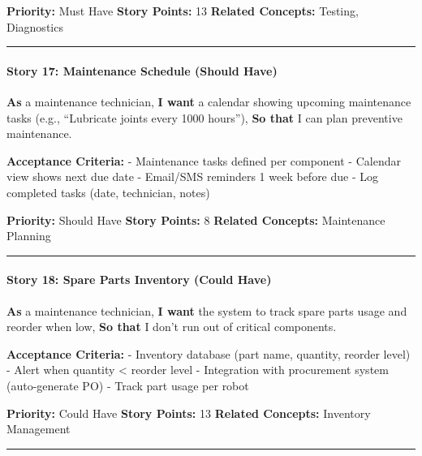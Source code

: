\documentclass[
]{article}
\begin{document}
\textbf{Priority:} Must Have \textbf{Story Points:} 13 \textbf{Related
Concepts:} Testing, Diagnostics

\begin{center}\rule{0.5\linewidth}{0.5pt}\end{center}

\hypertarget{story-17-maintenance-schedule-should-have}{%
\paragraph{Story 17: Maintenance Schedule (Should
Have)}\label{story-17-maintenance-schedule-should-have}}

\textbf{As} a maintenance technician, \textbf{I want} a calendar showing
upcoming maintenance tasks (e.g., ``Lubricate joints every 1000
hours''), \textbf{So that} I can plan preventive maintenance.

\textbf{Acceptance Criteria:} - Maintenance tasks defined per component
- Calendar view shows next due date - Email/SMS reminders 1 week before
due - Log completed tasks (date, technician, notes)

\textbf{Priority:} Should Have \textbf{Story Points:} 8 \textbf{Related
Concepts:} Maintenance Planning

\begin{center}\rule{0.5\linewidth}{0.5pt}\end{center}

\hypertarget{story-18-spare-parts-inventory-could-have}{%
\paragraph{Story 18: Spare Parts Inventory (Could
Have)}\label{story-18-spare-parts-inventory-could-have}}

\textbf{As} a maintenance technician, \textbf{I want} the system to
track spare parts usage and reorder when low, \textbf{So that} I don't
run out of critical components.

\textbf{Acceptance Criteria:} - Inventory database (part name, quantity,
reorder level) - Alert when quantity \textless{} reorder level -
Integration with procurement system (auto-generate PO) - Track part
usage per robot

\textbf{Priority:} Could Have \textbf{Story Points:} 13 \textbf{Related
Concepts:} Inventory Management

\begin{center}\rule{0.5\linewidth}{0.5pt}\end{center}
\end{document}
